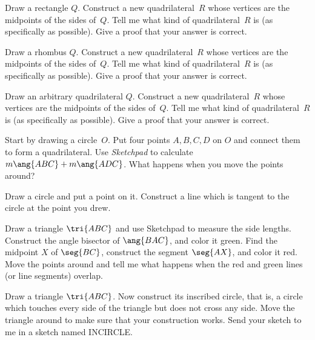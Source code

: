 \begin{SA}
Draw a rectangle $Q$.  Construct a new quadrilateral~$R$ whose vertices
are the midpoints of the sides of~$Q$.  Tell me what kind of
quadrilateral~$R$ is (as specifically as possible).  Give a proof
that your answer is correct.
\end{SA}

\begin{SA}
Draw a rhombus $Q$.  Construct a new quadrilateral~$R$ whose vertices
are the midpoints of the sides of~$Q$.  Tell me what kind of
quadrilateral~$R$ is (as specifically as possible).  Give a proof
that your answer is correct.
\end{SA}

\begin{SA}
Draw an arbitrary quadrilateral $Q$.  Construct a new quadrilateral~$R$
whose vertices are the midpoints of the sides of~$Q$.  Tell me what kind of
quadrilateral~$R$ is (as specifically as possible).  Give a proof
that your answer is correct.
\end{SA}

\begin{SA} Start by drawing a circle~$O$.
Put four points $A,B,C,D$ on $O$ and connect them
to form a quadrilateral. Use \textit{Sketchpad} to calculate $m\ang{ABC}+m\ang{ADC}$.
What happens when you move the points around?
\end{SA}

\begin{SA}
Draw a circle and put a point on it.  Construct a line which is
tangent to the circle at the point you drew.
\end{SA}

\begin{SA} \label{triangle-same-center}
Draw a triangle $\tri{ABC}$ and use Sketchpad to measure the side
lengths.  Construct the angle bisector of $\ang{BAC}$,
and color it green.   Find the midpoint $X$ of $\seg{BC}$, construct
the segment $\seg{AX}$, and color it red.  Move
the points around and tell me what happens when the red and green lines
(or line segments) overlap.
\end{SA}

\begin{SA} \label{incircle}
Draw a triangle $\tri{ABC}$.  Now construct its inscribed circle,
that is, a circle which touches every side of the triangle but
does not cross any side.  Move the triangle around to make sure that your
construction works.  Send your sketch to me in a sketch named
INCIRCLE.
\end{SA}

